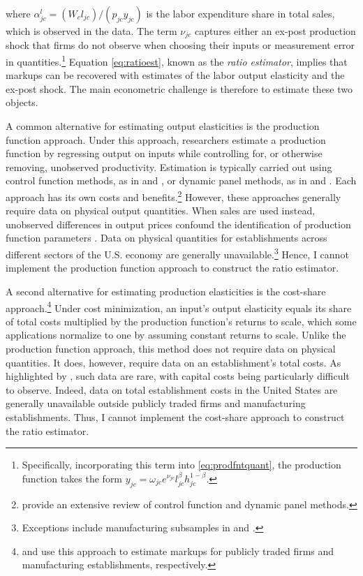 where $\alpha_{jc}^l = (W_c l_{jc})/(p_{jc} y_{jc})$ is the labor expenditure share in total sales, which is observed in the data. The term $\nu_{jc}$ captures either an ex-post production shock that firms do not observe when choosing their inputs or measurement error in quantities.\footnote{Specifically, incorporating this term into \eqref{eq:prodfntquant}, the production function takes the form $y_{jc} =\omega_{jc} e^{\nu_{jc}}l_{jc}^{\beta}h_{jc}^{1-\beta}$.} Equation \eqref{eq:ratioest}, known as the \textit{ratio estimator}, implies that markups can be recovered with estimates of the labor output elasticity and the ex-post shock. The main econometric challenge is therefore to estimate these two objects.

A common alternative for estimating output elasticities is the production function approach. Under this approach, researchers estimate a production function by regressing output on inputs while controlling for, or otherwise removing, unobserved productivity. Estimation is typically carried out using control function methods, as in \textcite{AckerbergCaves&Frazer15} and \textcite{GandhiNavarro&Rivers20}, or dynamic panel methods, as in \textcite{Arellano&Bover95} and \textcite{Blundell&Bond1998, Blundell&Bond2000}. Each approach has its own costs and benefits.\footnote{\textcite{DeLoecker&Syverson21} provide an extensive review of control function and dynamic panel methods.} However, these approaches generally require data on physical output quantities. When sales are used instead, unobserved differences in output prices confound the identification of production function parameters \parencite{Bondetal21, DeRidderGrassi&Morzenti24}. Data on physical quantities for establishments across different sectors of the U.S. economy are generally unavailable.\footnote{Exceptions include manufacturing subsamples in \textcite{FosterHaltiwanger&Syverson08} and \textcite{Atalay14}.} Hence, I cannot implement the production function approach to construct the ratio estimator.

A second alternative for estimating production elasticities is the cost-share approach.\footnote{\textcite{DeLoeckerEeckhout&Unger2019} and \textcite{EdmondMidrigan&Xu23} use this approach to estimate markups for publicly traded firms and manufacturing establishments, respectively.} Under cost minimization, an input’s output elasticity equals its share of total costs multiplied by the production function’s returns to scale, which some applications normalize to one by assuming constant returns to scale. Unlike the production function approach, this method does not require data on physical quantities. It does, however, require data on an establishment’s total costs. As highlighted by \textcite{DeLoecker&Syverson21}, such data are rare, with capital costs being particularly difficult to observe. Indeed, data on total establishment costs in the United States are generally unavailable outside publicly traded firms and manufacturing establishments. Thus, I cannot implement the cost-share approach to construct the ratio estimator.

